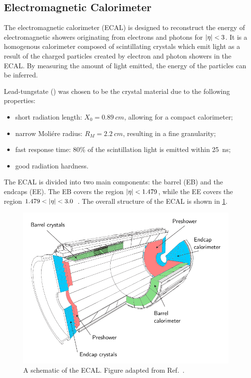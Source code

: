 \subsection{Electromagnetic Calorimeter}\label{sec:cms_ecal}
The electromagnetic calorimeter (ECAL) is designed to reconstruct the energy of electromagnetic showers originating from electrons and photons for $\lvert \eta \rvert < 3$. It is a homogenous calorimeter composed of scintillating crystals which emit light as a result of the charged particles created by electron and photon showers in the ECAL. By measuring the amount of light emitted, the energy of the particles can be inferred. 

Lead-tungstate (\pbw) was chosen to be the crystal material due to the following properties:
\begin{itemize}
  \item short radiation length: $X_0 = 0.89~\unit{cm}$, allowing for a compact calorimeter;
  \item narrow Moli\'ere radius: $R_M = 2.2~\unit{cm}$, resulting in a fine granularity;
  \item fast response time: 80\% of the scintillation light is emitted within 25~\unit{ns};
  \item good radiation hardness.
\end{itemize}
The ECAL is divided into two main components: the barrel (EB) and the endcaps (EE). The EB covers the region $\lvert \eta \rvert < 1.479$, while the EE covers the region $1.479 < \lvert \eta \rvert < 3.0$~\cite{CMS:2008xjf}. The overall structure of the ECAL is shown in \cref{fig:ecal}. 

\begin{figure}
  \centering
  \includegraphics[width=\textwidth]{Figures/Detector/CMS/ecal_coloured.pdf}
  \caption[The CMS ECAL]{A schematic of the ECAL. Figure adapted from Ref.~\cite{CMS:2008xjf}.}\label{fig:ecal}
\end{figure}

